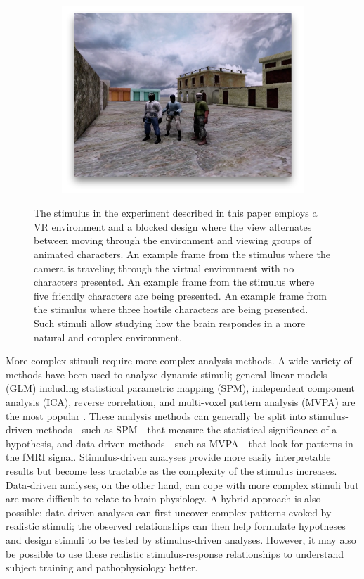 \documentclass[5p,authoryear]{elsarticle}
\begin{document}
\begin{figure}
\begin{subfigure}{0.3\textwidth}
\includegraphics[width=\textwidth]{figures/stimulus-three-insurgents}
\caption{}
\label{fig:stimulus-three-insurgents}
\end{subfigure}
\caption{
The stimulus in the experiment described in this paper employs a VR environment and a blocked design where the view alternates between moving through the environment and viewing groups of animated characters.
 An example frame from the stimulus where the camera is traveling through the virtual environment with no characters presented.
 An example frame from the stimulus where five friendly characters are being presented.
 An example frame from the stimulus where three hostile characters are being presented.
Such stimuli allow studying how the brain respondes in a more natural and complex environment.
}
\label{fig:stimulus}
\end{figure}

More complex stimuli require more complex analysis methods.
A wide variety of methods have been used to analyze dynamic stimuli; general linear models (GLM) including statistical parametric mapping (SPM), independent component analysis (ICA), reverse correlation, and multi-voxel pattern analysis (MVPA) are the most popular \citep{Spiers2007}.
These analysis methods can generally be split into stimulus-driven methods---such as SPM---that measure the statistical significance of a hypothesis, and data-driven methods---such as MVPA---that look for patterns in the fMRI signal.
Stimulus-driven analyses provide more easily interpretable results but become less tractable as the complexity of the stimulus increases.
Data-driven analyses, on the other hand, can cope with more complex stimuli but are more difficult to relate to brain physiology.
A hybrid approach is also possible: data-driven analyses can first uncover complex patterns evoked by realistic stimuli; the observed relationships can then help formulate hypotheses and design stimuli to be tested by stimulus-driven analyses. 
However, it may also be possible to use these realistic stimulus-response relationships to understand subject training and pathophysiology better.
\end{document}
